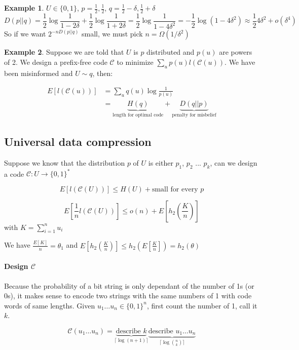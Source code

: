 \documentclass{article}
\theoremstyle{definition} %
\newtheorem{example}{Example}
\newcommand{\Ex}[1]{E\left[#1\right]}
\newcommand{\pfrac}[2]{\left( \frac{#1}{#2} \right)}
\def\C{\mathscr{C}}
\begin{document}
\begin{example}
  $U \in \{0,1\}$, $p=\frac 1 2, \frac 1 2$, $q=\frac 1 2 - \delta, \frac 1 2 + \delta$
  \[
    D(p||q) = \frac 1 2 \log \frac 1 {1-2\delta} + \frac 1 2 \log \frac 1 {1+2\delta} = \frac 1 2 \log \frac 1 {1-4\delta^2} = - \frac 1 2 \log (1-4\delta^2) \approx \frac 1 2 4\delta^2 + o(\delta^4)
  \]
  So if we want $2^{-n D(p||q)}$ small, we must pick $n=\Omega(1/\delta^2)$
\end{example}

\begin{example}
  Suppose we are told that $U$ is $p$ distributed and $p(u)$ are powers of 2. We design a prefix-free code $\C$ to minimize $\sum_u p(u) l(\C(u))$. We have been misinformed and $U\sim q$, then:

  \begin{align*}
    \Ex{l(\C(u))}
    &= \sum_u q(u) \log \frac 1 {p(u)}\\
    &= \underbrace{H(q)}_{\text{length for optimal code}} + \underbrace{D(q||p)}_{\text{penalty for misbelief}}
  \end{align*}
\end{example}

\subsection{Universal data compression}

Suppose we know that the distribution $p$ of $U$ is either $p_1$, $p_2$ ... $p_k$, can we design a code $\C: U \to \{0,1\}^*$

\[
  \Ex{l(\C(U))} \leq H(U) + \text{small for every } p
\]

\[
  \Ex{\frac 1 n l(\C(U))} \leq o(n) + \Ex{h_2 \pfrac K n}
\]
with $K = \sum_{i=1}^n u_i$

We have $\frac {\Ex{K}} n = \theta_1$ and $\Ex{h_2\pfrac K n} \leq h_2 \left(\Ex{\frac K n} \right) = h_2(\theta)$

\paragraph{Design $\C$}
Because the probability of a bit string is only dependant of the number of
1s (or 0s), it makes sense to encode two strings with the same numbers of 1
with code words of same lengths.
Given $u_1 \dots u_n \in \{0,1\}^n$, first count the number of 1, call it $k$.


\[
  \C(u_1 \dots u_n) =
  \underbrace{\text{describe } k}_{\lceil \log (n+1)\rceil}
  \underbrace{\text{describe } u_1 \dots u_n}_{\lceil \log {n \choose k}\rceil}
\]
\end{document}
